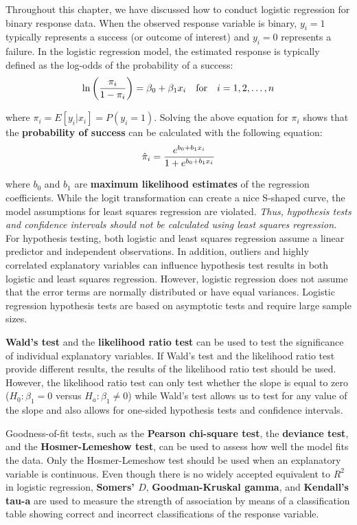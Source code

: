 \documentclass[
]{book}
\begin{document}
Throughout this chapter, we have discussed how to conduct logistic regression for binary response data. When the observed response variable is binary, \(y_i = 1\) typically represents a success (or outcome of interest) and \(y_i = 0\) represents a failure. In the logistic regression model, the estimated response is typically defined as the log-odds of the probability of a success:
\begin{align}
\ln\left(\frac{\pi_i}{1-\pi_i}\right) = \beta_0 + \beta_1 x_i \quad \text{for} \quad i = 1, 2, \ldots, n
\notag
\end{align}

where \(\pi_i = E[y_i | x_i] = P(y_i = 1)\). Solving the above equation for \(\pi_i\) shows that the \textbf{probability of success} can be calculated with the following equation:
\begin{align}
\hat{\pi}_i = \frac{e^{b_0 + b_1 x_i}}{1 + e^{b_0 + b_1 x_i}}
\notag
\end{align}

where \(b_0\) and \(b_1\) are \textbf{maximum likelihood estimates} of the regression coefficients. While the logit transformation can create a nice S-shaped curve, the model assumptions for least squares regression are violated. \textit{Thus, hypothesis tests and confidence intervals should not be calculated using least squares regression.} For hypothesis testing, both logistic and least squares regression assume a linear predictor and independent observations. In addition, outliers and highly correlated explanatory variables can influence hypothesis test results in both logistic and least squares regression. However, logistic regression does not assume that the error terms are normally distributed or have equal variances. Logistic regression hypothesis tests are based on asymptotic tests and require large sample sizes.

\textbf{Wald's test} and the \textbf{likelihood ratio test} can be used to test the significance of individual explanatory variables. If Wald's test and the likelihood ratio test provide different results, the results of the likelihood ratio test should be used. However, the likelihood ratio test can only test whether the slope is equal to zero (\(H_0: \beta_1 = 0\) versus \(H_a: \beta_1 \neq 0\)) while Wald's test allows us to test for any value of the slope and also allows for one-sided hypothesis tests and confidence intervals.

Goodness-of-fit tests, such as the \textbf{Pearson chi-square test}, the \textbf{deviance test}, and the \textbf{Hosmer-Lemeshow test}, can be used to assess how well the model fits the data. Only the Hosmer-Lemeshow test should be used when an explanatory variable is continuous. Even though there is no widely accepted equivalent to \(R^2\) in logistic regression, \textbf{Somers' \(D\)}, \textbf{Goodman-Kruskal gamma}, and \textbf{Kendall's tau-a} are used to measure the strength of association by means of a classification table showing correct and incorrect classifications of the response variable.
\end{document}
